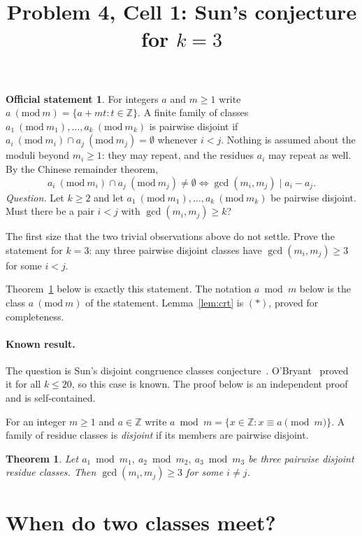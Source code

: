 \documentclass[11pt]{article}
\title{Problem 4, Cell 1: Sun's conjecture for $k=3$}
\author{}
\date{}
\newtheorem{theorem}{Theorem}
\theoremstyle{remark}
\theoremstyle{definition}
\newtheorem*{statement}{Official statement}
\begin{document}
\maketitle

\begin{statement}
For integers $a$ and $m\ge1$ write $a\ (\mathrm{mod}\ m)=\{a+mt:t\in\mathbb{Z}\}$. A finite family
of classes $a_1\ (\mathrm{mod}\ m_1),\dots,a_k\ (\mathrm{mod}\ m_k)$ is pairwise disjoint if
$a_i\ (\mathrm{mod}\ m_i)\cap a_j\ (\mathrm{mod}\ m_j)=\emptyset$ whenever $i<j$. Nothing is assumed
about the moduli beyond $m_i\ge1$: they may repeat, and the residues $a_i$ may repeat as well. By the
Chinese remainder theorem,
\[
  a_i\ (\mathrm{mod}\ m_i)\cap a_j\ (\mathrm{mod}\ m_j)\neq\emptyset\iff\gcd(m_i,m_j)\mid a_i-a_j.\tag{$*$}
\]
\emph{Question.} Let $k\ge2$ and let $a_1\ (\mathrm{mod}\ m_1),\dots,a_k\ (\mathrm{mod}\ m_k)$ be
pairwise disjoint. Must there be a pair $i<j$ with $\gcd(m_i,m_j)\ge k$?

The first size that the two trivial observations above do not settle. Prove the statement for
$k=3$: any three pairwise disjoint classes have $\gcd(m_i,m_j)\ge3$ for some $i<j$.
\end{statement}

\noindent Theorem~\ref{thm:main} below is exactly this statement. The notation $a\bmod m$ below is the class
$a\ (\mathrm{mod}\ m)$ of the statement. Lemma~\ref{lem:crt} is $(*)$, proved for completeness.

\paragraph{Known result.} The question is Sun's disjoint congruence classes conjecture~\cite{Sun06}.
O'Bryant~\cite{OBr07} proved it for all $k\le20$, so this case is known. The proof below is an
independent proof and is self-contained.

For an integer $m\ge1$ and $a\in\mathbb{Z}$ write $a\bmod m=\{x\in\mathbb{Z}: x\equiv a\pmod m\}$.
A family of residue classes is \emph{disjoint} if its members are pairwise disjoint.

\begin{theorem}\label{thm:main}
Let $a_1\bmod m_1,\ a_2\bmod m_2,\ a_3\bmod m_3$ be three pairwise disjoint residue classes.
Then $\gcd(m_i,m_j)\ge3$ for some $i\ne j$.
\end{theorem}

\section{When do two classes meet?}
\end{document}
